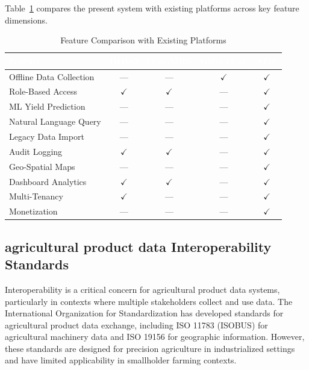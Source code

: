 \documentclass[12pt,a4paper,oneside]{report}
\begin{document}
Table~\ref{tab:comparison} compares the present system with existing platforms across key feature dimensions.

\begin{table}[H]
\centering
\caption{Feature Comparison with Existing Platforms}
\label{tab:comparison}
\renewcommand{\arraystretch}{1.4}
\begin{tabularx}{\textwidth}{X*{4}{c}}
\toprule
\rowcolor{headerblue}
\textcolor{white}{\textbf{Feature}} & \textcolor{white}{\textbf{DHIS2}} & \textcolor{white}{\textbf{OpenMRS}} & \textcolor{white}{\textbf{Islam et al.}} & \textcolor{white}{\textbf{ADP}} \\
\midrule
Offline Data Collection & --- & --- & $\checkmark$ & $\checkmark$ \\
\rowcolor{rowalt}
Role-Based Access & $\checkmark$ & $\checkmark$ & --- & $\checkmark$ \\
ML Yield Prediction & --- & --- & --- & $\checkmark$ \\
\rowcolor{rowalt}
Natural Language Query & --- & --- & --- & $\checkmark$ \\
Legacy Data Import & --- & --- & --- & $\checkmark$ \\
\rowcolor{rowalt}
Audit Logging & $\checkmark$ & $\checkmark$ & --- & $\checkmark$ \\
Geo-Spatial Maps & --- & --- & --- & $\checkmark$ \\
\rowcolor{rowalt}
Dashboard Analytics & $\checkmark$ & $\checkmark$ & --- & $\checkmark$ \\
Multi-Tenancy & $\checkmark$ & --- & --- & $\checkmark$ \\
\rowcolor{rowalt}
Monetization & --- & --- & --- & $\checkmark$ \\
\bottomrule
\end{tabularx}
\end{table}

\subsection{agricultural product data Interoperability Standards}
Interoperability is a critical concern for agricultural product data systems, particularly in contexts where multiple stakeholders collect and use data. The International Organization for Standardization has developed standards for agricultural product data exchange, including ISO 11783 (ISOBUS) for agricultural machinery data and ISO 19156 for geographic information. However, these standards are designed for precision agriculture in industrialized settings and have limited applicability in smallholder farming contexts.
\end{document}
